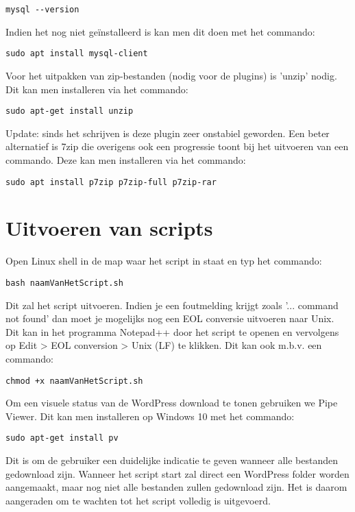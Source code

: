 \begin{verbatim}
mysql --version 
\end{verbatim}
Indien het nog niet geïnstalleerd is kan men dit doen met het commando:
\begin{verbatim}
sudo apt install mysql-client
\end{verbatim}
Voor het uitpakken van zip-bestanden (nodig voor de plugins) is 'unzip' nodig. Dit kan men installeren via het commando:
\begin{verbatim}
sudo apt-get install unzip
\end{verbatim}
Update: sinds het schrijven is deze plugin zeer onstabiel geworden. Een beter alternatief is 7zip die overigens ook een progressie toont bij het uitvoeren van een commando. Deze kan men installeren via het commando:
\begin{verbatim}
sudo apt install p7zip p7zip-full p7zip-rar
\end{verbatim}
\section{Uitvoeren van scripts}
Open Linux shell in de map waar het script in staat en typ het commando:\begin{verbatim} 
bash naamVanHetScript.sh
\end{verbatim}
Dit zal het script uitvoeren. Indien je een foutmelding krijgt zoals '... command not found' dan moet je mogelijks nog een EOL conversie uitvoeren naar Unix. Dit kan in het programma Notepad++ door het script te openen en vervolgens op Edit > EOL conversion > Unix (LF) te klikken. Dit kan ook m.b.v. een commando:
\begin{verbatim}
chmod +x naamVanHetScript.sh
\end{verbatim}
Om een visuele status van de WordPress download te tonen gebruiken we Pipe Viewer. Dit kan men installeren op Windows 10 met het commando:\begin{verbatim}
sudo apt-get install pv
\end{verbatim}
Dit is om de gebruiker een duidelijke indicatie te geven wanneer alle bestanden gedownload zijn. Wanneer het script start zal direct een WordPress folder worden aangemaakt, maar nog niet alle bestanden zullen gedownload zijn. Het is daarom aangeraden om te wachten tot het script volledig is uitgevoerd. 
